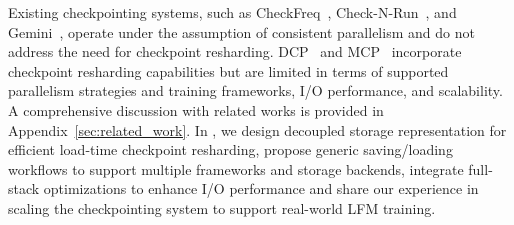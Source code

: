 Existing checkpointing systems, such as CheckFreq~\cite{checkfreq}, Check-N-Run~\cite{check-n-run}, and Gemini~\cite{gemini-sys}, operate under the assumption of consistent parallelism and do not address the need for checkpoint resharding.
DCP~\cite{torch-dcp} and MCP~\cite{torch-dcp} incorporate checkpoint resharding capabilities but are limited in terms of supported parallelism strategies and training frameworks, I/O performance, and scalability.
A comprehensive discussion with related works is provided in Appendix~\ref{sec:related_work}.
In \sys{}, we design decoupled storage representation for efficient load-time checkpoint resharding, propose generic saving/loading workflows to support multiple frameworks and storage backends, integrate full-stack optimizations to enhance I/O performance and share our experience in scaling the checkpointing system to support real-world LFM training.
